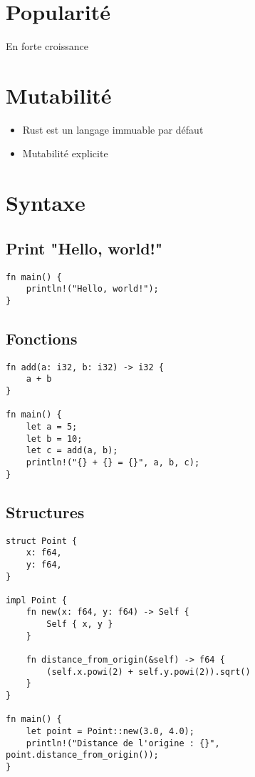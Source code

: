 \documentclass{article}
\begin{document}
\section{Popularité}
En forte croissance

\section{Mutabilité}
\begin{itemize}
    \item Rust est un langage immuable par défaut
    \item Mutabilité explicite
\end{itemize}

\section{Syntaxe}
\subsection{Print "Hello, world!"}
\begin{lstlisting}[]
fn main() {
    println!("Hello, world!");
}
\end{lstlisting}

\subsection{Fonctions}
\begin{lstlisting}[]
fn add(a: i32, b: i32) -> i32 {
    a + b
}

fn main() {
    let a = 5;
    let b = 10;
    let c = add(a, b);
    println!("{} + {} = {}", a, b, c);
}
\end{lstlisting}

\subsection{Structures}
\begin{lstlisting}[]
struct Point {
    x: f64,
    y: f64,
}

impl Point {
    fn new(x: f64, y: f64) -> Self {
        Self { x, y }
    }

    fn distance_from_origin(&self) -> f64 {
        (self.x.powi(2) + self.y.powi(2)).sqrt()
    }
}

fn main() {
    let point = Point::new(3.0, 4.0);
    println!("Distance de l'origine : {}", point.distance_from_origin());
}
\end{lstlisting}
\end{document}
